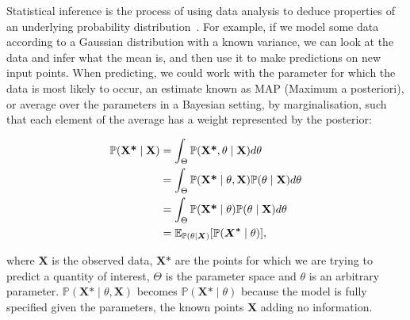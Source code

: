 \documentclass[12pt]{report}
\newcommand{\bs}{\boldsymbol}
\newcommand{\E}{\mathbb{E}}
\renewcommand{\P}{\mathbb{P}}
\renewcommand{\bs}{\boldsymbol}
\begin{document}
Statistical inference is the process of using data analysis to deduce properties of an underlying probability distribution~\parencite{statinference}. For example, if we model some data according to a Gaussian distribution with a known variance, we can look at the data and infer what the mean is, and then use it to make predictions on new input points. When predicting, we could work with the parameter for which the data is most likely to occur, an estimate known as MAP (Maximum a posteriori), or average over the parameters in a Bayesian setting, by marginalisation, such that each element of the average has a weight represented by the posterior:

\newpage
\begin{align}
    \mathbb{P}(\textbf{X*} \mid \textbf{X}) &= \int_{\Theta} \mathbb{P}(\textbf{X*}, \theta \mid \textbf{X}) d\theta\\
    &= \int_{\Theta} \mathbb{P}(\textbf{X*} \mid \theta, \textbf{X}) \mathbb{P}(\theta \mid \textbf{X}) d\theta \\ 
    &= \int_{\Theta} \mathbb{P}(\textbf{X*} \mid \theta) \mathbb{P}(\theta \mid \textbf{X}) d\theta \label{predict}\\
    &= \E_{\P(\theta \mid \bs{X})}[\P(\bs{X^*} \mid \theta)], \notag
\end{align}

\noindent
where $\textbf{X}$ is the observed data, $\textbf{X*}$ are the points for which we are trying to predict a quantity of interest, $\Theta$ is the parameter space and $\theta$ is an arbitrary parameter. $\P(\textbf{X*} \mid \theta, \textbf{X})$ becomes $\P(\textbf{X*} \mid \theta)$ because the model is fully specified given the parameters, the known points $\bs{X}$ adding no information. \\
\end{document}
